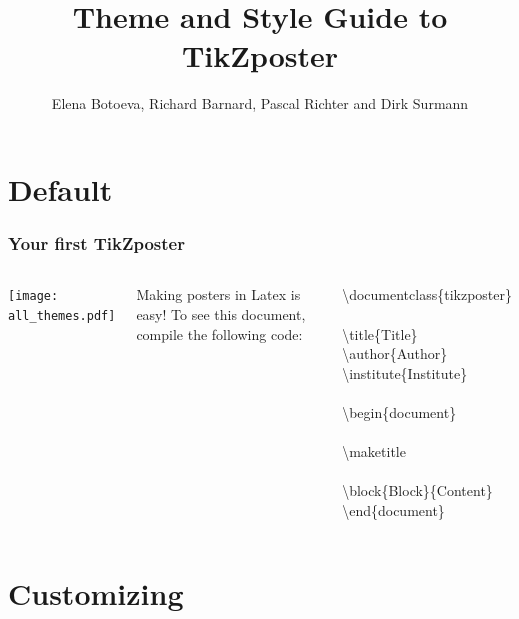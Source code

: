 \documentclass[9pt]{beamer}
\title{Theme and Style Guide to TikZposter}
\author[] {Elena Botoeva, Richard Barnard, Pascal Richter and Dirk Surmann}
\newcommand{\bs}{\textbackslash}   %
\begin{document}
\begin{frame}
  \titlepage
\end{frame}

\section{Default}

\begin{frame}
  \frametitle{Your first TikZposter}
  
  \begin{columns}
    \texttt{[image: all\_themes.pdf]}

    Making posters in Latex is easy! To see this document, compile the following
    code:

    \medskip
    \hspace{0.2cm}
    \begin{minipage}{.55\textwidth}\small
      \bs documentclass\{tikzposter\}\\
      \\
      \bs title\{Title\}\\
      \bs author\{Author\}\\
      \bs institute\{Institute\}\\
      \\
      \bs begin\{document\}\\
      \\
      \bs maketitle\\
      \\
      \bs block\{Block\}\{Content\}\\
      \bs end\{document\}
    \end{minipage}

  \end{columns}
\end{frame}

\section{Customizing}
\end{document}
